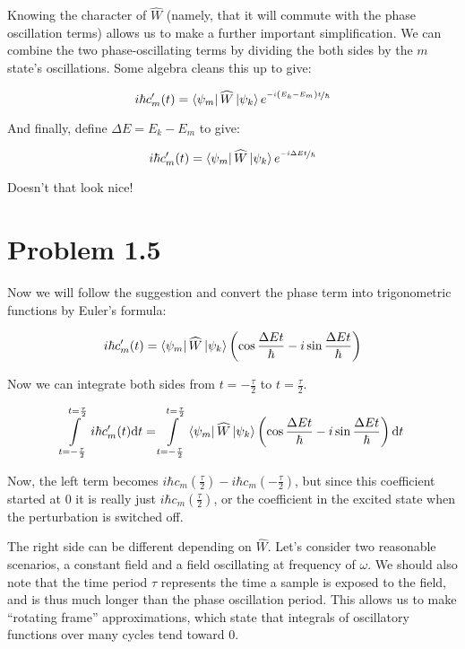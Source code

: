 \documentclass[12pt, openany, letterpaper]{memoir}
\begin{document}
Knowing the character of $\widehat{W}$ (namely, that it will commute with the phase oscillation terms) allows us to make a further important simplification. We can combine the two phase-oscillating terms by dividing the both sides by the $m$ state's oscillations. Some algebra cleans this up to give:

$$
i\hbar c^\prime_m(t)= \left< \psi_m \right|\widehat{W} \left| \psi_k \right>e^{\nicefrac{-i\left(E_k-E_m\right)t}{\hbar}}
$$

And finally, define $\Delta E = E_k-E_m$ to give:

$$
i\hbar c^\prime_m(t)= \left< \psi_m \right|\widehat{W} \left| \psi_k \right>e^{\nicefrac{-i\Delta Et}{\hbar}}
$$

Doesn't that look nice!

\section*{Problem 1.5}


Now we will follow the suggestion and convert the phase term into trigonometric functions by Euler's formula:

$$
i\hbar c^\prime_m(t)= \left< \psi_m \right|\widehat{W} \left| \psi_k \right>\left(\cos \frac{\Delta Et}{\hbar} - i\sin\frac{\Delta Et}{\hbar}\right)
$$

Now we can integrate both sides from $t=-\frac{\tau}{2}$ to $t=\frac{\tau}{2}$.

$$
\int\limits_{t=-\frac{\tau}{2}}^{t=\frac{\tau}{2}}i\hbar c^\prime_m(t) \mathrm{d}t= \int\limits_{t=-\frac{\tau}{2}}^{t=\frac{\tau}{2}}\left< \psi_m \right|\widehat{W} \left| \psi_k \right>\left(\cos \frac{\Delta Et}{\hbar} - i\sin\frac{\Delta Et}{\hbar}\right)\mathrm{d}t
$$

Now, the left term becomes $i\hbar c_m\left(\frac{\tau}{2}\right) - i\hbar c_m\left(-\frac{\tau}{2}\right)$, but since this coefficient started at $0$ it is really just $i\hbar c_m\left(\frac{\tau}{2}\right)$, or the coefficient in the excited state when the perturbation is switched off.

The right side can be different depending on $\widehat{W}$. Let's consider two reasonable scenarios, a constant field and a field oscillating at frequency of $\omega$. We should also note that the time period $\tau$ represents the time a sample is exposed to the field, and is thus much longer than the phase oscillation period. This allows us to make ``rotating frame'' approximations, which state that integrals of oscillatory functions over many cycles tend toward $0$.
\end{document}
